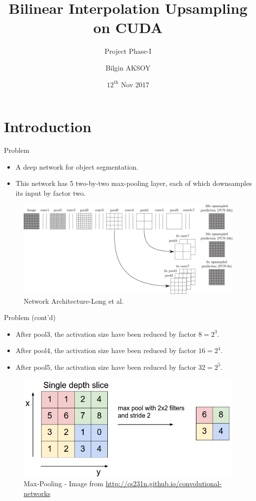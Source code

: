 \documentclass{beamer}
\title[Applied Parallel Programming]{Bilinear Interpolation Upsampling on CUDA}
\subtitle{Project Phase-I}
\author{Bilgin AKSOY}
\institute{\bf Informatics Enstitute}
\date{$12^{\text{th}}$ Nov 2017}
\begin{document}
	\begin{frame}
	  \titlepage
	\end{frame}

\section{Introduction}

	\begin{frame}{Problem}
		
		\begin{itemize}
		  \item A deep network for object segmentation.  
		  \item \justifying This network has 5 two-by-two max-pooling layer, each of which downsamples its input by factor two. 
		\end{itemize}
		\begin{figure}
		  \includegraphics[scale=0.15]{./Figures/DAGnet.jpg}
		  \caption{\label{fig:DAGnet}Network Architecture-Long et al.\cite{long2015fully}}
		\end{figure}	
	\end{frame}
	\begin{frame}{Problem (cont'd)}
		\begin{itemize}
				\item After pool3, the activation size have been reduced by factor $8= 2^3 $.
				\item After pool4, the activation size have been reduced by factor $16= 2^4 $.
				\item After pool5, the activation size have been reduced by factor $32= 2^5 $.
		\end{itemize}
		\begin{figure}
					\includegraphics[scale=0.3]{./Figures/maxpool.jpeg}
					\caption{Max-Pooling - Image from \url{http://cs231n.github.io/convolutional-networks}}
		\end{figure}
	\end{frame}
\end{document}
